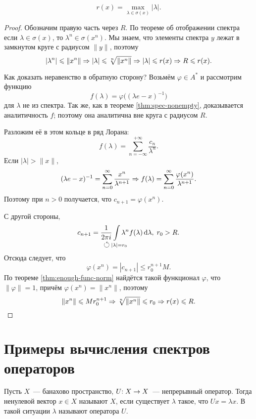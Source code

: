 \documentclass{notes}
\begin{document}
	\begin{thm}
		\[	
			r(x) = \max\limits_{\lambda \in \sigma(x)} |\lambda|.
		\]
		\begin{proof}
			Обозначим правую часть через $R$. По теореме об отображении спектра если $\lambda \in \sigma(x)$, то $\lambda^n \in \sigma(x^n)$. Мы знаем, что элементы спектра $y$ лежат в замкнутом круге с радиусом $\|y\|$, поэтому
			\[
				|\lambda^n| \leqslant \|x^n\| \Rightarrow |\lambda| \leqslant \sqrt[n]{\|x^n\|} \Rightarrow |\lambda| \leqslant r(x) \Rightarrow R \leqslant r(x).
			\]

			Как доказать неравенство в обратную сторону? Возьмём $\varphi \in A^{*}$ и рассмотрим функцию 
			\[
				f(\lambda) = \varphi\big((\lambda e - x)^{-1}\big)
			\]
			для $\lambda$ не из спектра. Так же, как в теореме \ref{thm:spec-nonempty}, доказывается аналитичность $f$; поэтому она аналитична вне круга с радиусом $R$.

			Разложим её в этом кольце в ряд Лорана:
			\[
				f(\lambda) = \sum\limits_{n = -\infty}^{+\infty} \dfrac{c_n}{\lambda^n}.
			\]
			Если $|\lambda| > \|x\|$, 
			\[
				(\lambda e - x)^{-1} = \sum\limits_{n = 0}^{\infty} \dfrac{x^n}{\lambda^{n + 1}} \Rightarrow f(\lambda) = \sum\limits_{n = 0}^{\infty} \dfrac{\varphi(x^n)}{\lambda^{n + 1}}.
			\]
			Поэтому при $n>0$ получается, что $c_{n + 1} = \varphi(x^n)$.

			С другой стороны, 
			\[
				c_{n + 1} = \dfrac{1}{2 \pi i} \int\limits_{\mathclap{\leftturn \, |\lambda| = r_0}} \lambda^n f(\lambda) \D \lambda, \; r_0 > R.
			\]
			Отсюда следует, что
			\[
				\varphi(x^n) = |c_{n + 1}| \leqslant r_0^{n + 1} M.
			\]
			По теореме \ref{thm:enough-func-norm} найдётся такой функционал $\varphi$, что $\|\varphi\| = 1$, причём $\varphi(x^n) = \|x^n\|$, поэтому
			\[
				\|x^n\| \leqslant M r_0^{n + 1} \Rightarrow \sqrt[n]{\|x^n\|} \leqslant r_0 \Rightarrow r(x) \leqslant R.
			\]
		\end{proof}
	\end{thm}

\section{Примеры вычисления спектров операторов}

	\begin{de}
		Пусть $X$~--- банахово пространство, $U\text{\text{:}} \; X \to X$~--- непрерывный оператор. Тогда ненулевой вектор $x \in X$ называют  $X$, если существует $\lambda$ такое, что $U x = \lambda x$. В такой ситуации $\lambda$ называют  оператора $U$.
	\end{de}
\end{document}
